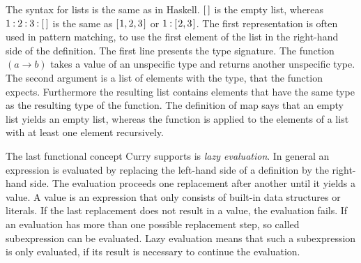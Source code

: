 \documentclass[%
	pdftex,%
	a4paper,%
	oneside,%
	chapterprefix,%
	headsepline,%
	12pt%
]{scrbook}
\newcommand{\Varid}[1]{\mathit{#1}}
\def\resethooks{%
  \global\let\SaveRestoreHook\empty
  \global\let\ColumnHook\empty}
\let\hspre\empty
\let\hspost\empty
\begin{document}
\resethooks

The syntax for lists is the same as in Haskell. %
\ensuremath{[\mskip1.5mu \mskip1.5mu]} is the empty list, whereas \ensuremath{\mathrm{1}\mathbin{:}\mathrm{2}\mathbin{:}\mathrm{3}\mathbin{:}[\mskip1.5mu \mskip1.5mu]} is the same as \ensuremath{[\mskip1.5mu \mathrm{1},\mathrm{2},\mathrm{3}\mskip1.5mu]} or
\ensuremath{\mathrm{1}\mathbin{:}[\mskip1.5mu \mathrm{2},\mathrm{3}\mskip1.5mu]}. %
The first representation is often used in pattern matching, to use the
first element of the list in the right-hand side of the definition. %
The first line presents the type signature. %
The function \ensuremath{(\Varid{a}\to \Varid{b})} takes a value of an unspecific type and returns
another unspecific type. %
The second argument is a list of elements with the type, that the
function expects. %
Furthermore the resulting list contains elements that have the same
type as the resulting type of the function. %
The definition of map says that an empty list yields an empty list,
whereas the function is applied to the elements of a list with at
least one element recursively. %

The last functional concept Curry supports is \emph{lazy
  evaluation}. %
In general an expression is evaluated by replacing the left-hand side
of a definition by the right-hand side. %
The evaluation proceeds one replacement after another until it yields
a value. %
A value is an expression that only consists of built-in data
structures or literals. %
If the last replacement does not result in a value, the evaluation
fails. %
If an evaluation has more than one possible replacement step, so
called subexpression can be evaluated. %
Lazy evaluation means that such a subexpression is only evaluated, if
its result is necessary to continue the evaluation. %
\end{document}
